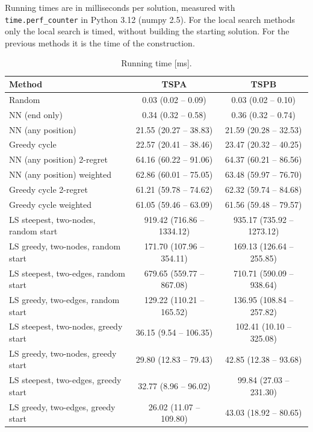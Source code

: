 \documentclass[11pt,a4paper]{article}
\begin{document}
Running times are in milliseconds per solution, measured with \texttt{time.perf\_counter} in
Python 3.12 (numpy 2.5). For the local search methods only the local search is timed, without
building the starting solution. For the previous methods it is the time of the construction.
\begin{table}[H]
\centering
\small
\begin{tabular}{lcc}
\toprule
Method & TSPA & TSPB \\
\midrule
Random & 0.03 (0.02 -- 0.09) & 0.03 (0.02 -- 0.10) \\
NN (end only) & 0.34 (0.32 -- 0.58) & 0.36 (0.32 -- 0.74) \\
NN (any position) & 21.55 (20.27 -- 38.83) & 21.59 (20.28 -- 32.53) \\
Greedy cycle & 22.57 (20.41 -- 38.46) & 23.47 (20.32 -- 40.25) \\
NN (any position) 2-regret & 64.16 (60.22 -- 91.06) & 64.37 (60.21 -- 86.56) \\
NN (any position) weighted & 62.86 (60.01 -- 75.05) & 63.48 (59.97 -- 76.70) \\
Greedy cycle 2-regret & 61.21 (59.78 -- 74.62) & 62.32 (59.74 -- 84.68) \\
Greedy cycle weighted & 61.05 (59.46 -- 63.09) & 61.56 (59.48 -- 79.57) \\
\midrule
LS steepest, two-nodes, random start & 919.42 (716.86 -- 1334.12) & 935.17 (735.92 -- 1273.12) \\
LS greedy, two-nodes, random start & 171.70 (107.96 -- 354.11) & 169.13 (126.64 -- 255.85) \\
LS steepest, two-edges, random start & 679.65 (559.77 -- 867.08) & 710.71 (590.09 -- 938.64) \\
LS greedy, two-edges, random start & 129.22 (110.21 -- 165.52) & 136.95 (108.84 -- 257.82) \\
LS steepest, two-nodes, greedy start & 36.15 (9.54 -- 106.35) & 102.41 (10.10 -- 325.08) \\
LS greedy, two-nodes, greedy start & 29.80 (12.83 -- 79.43) & 42.85 (12.38 -- 93.68) \\
LS steepest, two-edges, greedy start & 32.77 (8.96 -- 96.02) & 99.84 (27.03 -- 231.30) \\
LS greedy, two-edges, greedy start & 26.02 (11.07 -- 109.80) & 43.03 (18.92 -- 80.65) \\
\bottomrule
\end{tabular}
\caption{Running time [ms].}
\end{table}
\end{document}
